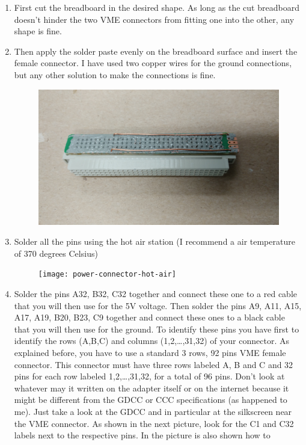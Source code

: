 \begin{enumerate}
\item First cut the breadboard in the desired shape. As long as the cut
  breadboard doesn't hinder the two VME connectors from fitting one into the
  other, any shape is fine.
\item Then apply the solder paste evenly on the breadboard surface and insert
  the female connector. I have used two copper wires for the ground connections,
  but any other solution to make the connections is fine.
  \begin{figure}[H]
    \centering \includegraphics[width=0.7\linewidth,
    frame]{power-connector-solder-paste}
  \end{figure}
\item Solder all the pins using the hot air station (I recommend a air
  temperature of 370 degrees Celsius)
  \begin{figure}[H]
    \centering \texttt{[image: power-connector-hot-air]}
  \end{figure}
\item Solder the pins A32, B32, C32 together and connect these one to a red
  cable that you will then use for the 5V voltage.  Then solder the pins A9,
  A11, A15, A17, A19, B20, B23, C9 together and connect these ones to a black
  cable that you will then use for the ground. To identify these pins you have
  first to identify the rows (A,B,C) and columns (1,2,\dots,31,32) of your
  connector. As explained before, you have to use a standard 3 rows, 92 pins VME
  female connector. This connector must have three rows labeled A, B and C and
  32 pins for each row labeled 1,2,\dots,31,32, for a total of 96 pins. Don't
  look at whatever may it written on the adapter itself or on the internet
  because it might be different from the GDCC or CCC specifications (as happened
  to me). Just take a look at the GDCC and in particular at the silkscreen near
  the VME connector. As shown in the next picture, look for the C1 and C32
  labels next to the respective pins. In the picture is also shown how to

\end{enumerate}
